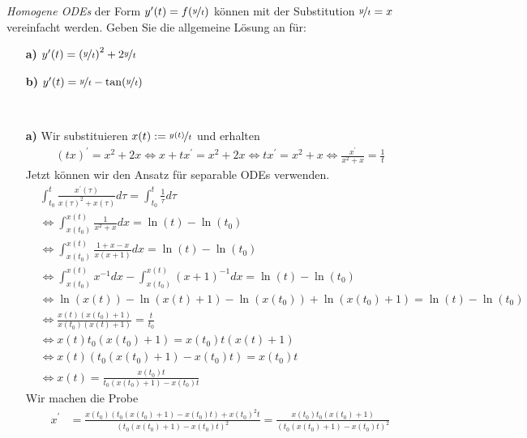 \begin{exercise}
\textit{Homogene ODEs} der Form $y^{\prime}(t) = f(\nicefrac{y}{t})$
können mit der Substitution $\nicefrac{y}{t} = x$ vereinfacht werden.
Geben Sie die allgemeine Lösung an für:
\begin{itemize}
  \item [\textbf{a)}] $y^{\prime}(t) = \left(\nicefrac{y}{t}\right)^2
  + 2\nicefrac{y}{t}$
  \item [\textbf{b)}] $y^{\prime}(t) = \nicefrac{y}{t} - \tan(\nicefrac{y}{t})$
\end{itemize}
\end{exercise}
\begin{solution}
\leavevmode \\
\begin{itemize}
  \item [\textbf{a)}] Wir substituieren $x(t) := \nicefrac{y(t)}{t}$ und erhalten
  \begin{align*}
    (tx)^{\prime} = x^2 + 2x \iff x + tx^\prime = x^2 + 2x \iff t x^\prime = x^2 + x \iff \frac{x^{\prime}}{x^2 + x} = \frac{1}{t}
  \end{align*}
  Jetzt können wir den Ansatz für separable ODEs verwenden.
  \begin{align*}
    &\int_{t_0}^t \frac{x^{\prime}(\tau)}{x(\tau)^2 + x(\tau)}d\tau = \int_{t_0}^t \frac{1}{\tau}d\tau \\
    &\iff \int_{x(t_0)}^{x(t)} \frac{1}{x^2 + x}dx = \ln(t) - \ln(t_0)\\
    &\iff \int_{x(t_0)}^{x(t)} \frac{1 + x - x}{x(x + 1)} dx = \ln(t) - \ln(t_0)\\
    &\iff \int_{x(t_0)}^{x(t)} x^{-1} dx - \int_{x(t_0)}^{x(t)} (x + 1)^{-1} dx = \ln(t) - \ln(t_0)\\
    &\iff \ln(x(t)) - \ln(x(t) + 1) - \ln(x(t_0)) + \ln(x(t_0) + 1) = \ln(t) - \ln(t_0)\\
    &\iff \frac{x(t)(x(t_0) + 1)}{x(t_0)(x(t) + 1)} = \frac{t}{t_0} \\
    &\iff x(t)t_0(x(t_0) + 1) = x(t_0)t(x(t) + 1) \\
    &\iff x(t)(t_0(x(t_0) + 1) - x(t_0)t) = x(t_0)t \\
    &\iff x(t) = \frac{x(t_0)t}{t_0(x(t_0) + 1) - x(t_0)t}
  \end{align*}
  Wir machen die Probe
  \begin{align*}
    x^{\prime} &= \frac{x(t_0)(t_0(x(t_0) + 1) - x(t_0)t) + x(t_0)^2t}{(t_0(x(t_0) + 1) - x(t_0)t)^2}
    = \frac{x(t_0)t_0(x(t_0) + 1)}{(t_0(x(t_0) + 1) - x(t_0)t)^2}\\

\end{align*}
\end{itemize}
\end{solution}
